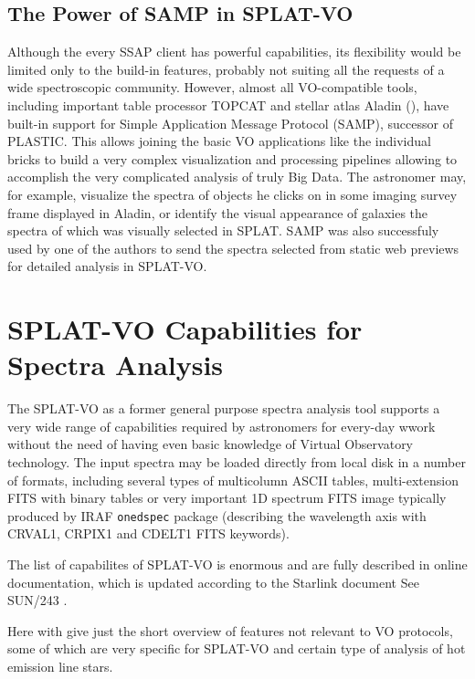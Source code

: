 \documentclass[final,authoryear,5p,times,twocolumn]{elsarticle}
\begin{document}

\subsection{The Power of SAMP in SPLAT-VO}

Although the every SSAP client has  powerful capabilities, its flexibility
would be limited only to the build-in features, probably not suiting all the
requests of a wide spectroscopic community. However, almost all VO-compatible
tools, including important table processor TOPCAT and stellar atlas
Aladin (),
have built-in support for Simple Application Message Protocol (SAMP), successor
of PLASTIC.  This allows joining the basic VO applications like the individual
bricks to build a very complex visualization and processing pipelines allowing
to accomplish the very complicated analysis of truly Big Data.  The astronomer
may, for example, visualize the spectra of objects he clicks on in some imaging
survey frame displayed in Aladin, or identify the visual appearance of galaxies
the spectra of which was visually selected in SPLAT.  SAMP was also successfuly
used by one of the authors to send the spectra selected from   static web
previews for detailed analysis in SPLAT-VO.


\section{SPLAT-VO Capabilities  for Spectra Analysis}

The SPLAT-VO as a former general purpose spectra analysis tool supports a very
wide range of capabilities required by astronomers for every-day wwork without
the need of having even basic knowledge of Virtual Observatory technology. The
input spectra may be loaded directly from local disk in a number of formats,
including several types of multicolumn ASCII tables, multi-extension FITS with
binary tables or very important 1D spectrum FITS image typically produced by
IRAF {\tt onedspec} package (describing the wavelength axis with CRVAL1, CRPIX1
and CDELT1 FITS keywords).

The list of capabilites of SPLAT-VO is enormous and are fully described in
online documentation, which is updated according to the Starlink document  See SUN/243
\cite{SUN243}.

Here with give just the short overview of features not relevant to VO
protocols, some of which are very
specific for SPLAT-VO and certain type of analysis of hot emission line stars.
\end{document}
